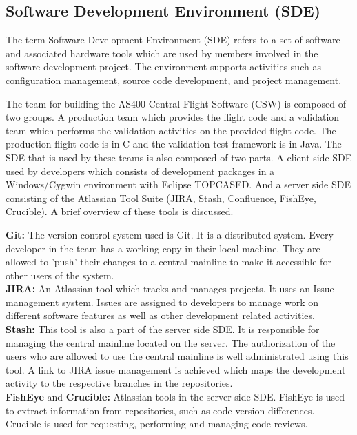 \documentclass[12pt, a4paper, titlepage]{scrartcl}
\begin{document}
\subsection{Software Development Environment (SDE)}
\par The term Software Development Environment (SDE) refers to a set of software and associated hardware tools which are used by members involved in the software development project. The environment supports activities such as configuration management, source code development, and project management\cite{dart1992overview}. 
\par The team for building the AS400 Central Flight Software (CSW) is composed of two groups. A production team which provides the flight code and a validation team which performs the validation activities on the provided flight code. The production flight code is in C and the validation test framework is in Java. The SDE that is used by these teams is also composed of two parts. A client side SDE used by developers which consists of development packages in a Windows/Cygwin environment with Eclipse TOPCASED.  And a server side SDE consisting of the Atlassian Tool Suite (JIRA, Stash, Confluence, FishEye, Crucible). A brief overview of these tools is discussed.
\par \textbf{Git:} The version control system used is Git\cite{GitflowWorkflow}. It is a distributed system. Every developer in the team has a working copy in their local machine. They are allowed to 'push' their changes to a central mainline to make it accessible for other users of the system.\\
\textbf{JIRA:} An Atlassian tool which tracks and manages projects\cite{fisher2013utilizing}. It uses an Issue management system. Issues\cite{jiraIssue} are assigned to developers to manage work on different software features as well as other development related activities. \\
\textbf{Stash:} This tool is also a part of the server side SDE. It is responsible for managing the central mainline located on the server. The authorization of the users who are allowed to use the central mainline is well administrated using this tool. A link to JIRA issue management is achieved which maps the development activity to the respective branches in the repositories.\\
\textbf{FishEye }and \textbf{Crucible:} Atlassian tools in the server side SDE. FishEye is used to extract information from repositories, such as code version differences. Crucible is used for requesting, performing and managing code reviews\cite{bacchelli2013expectations}.\\ 
\end{document}
